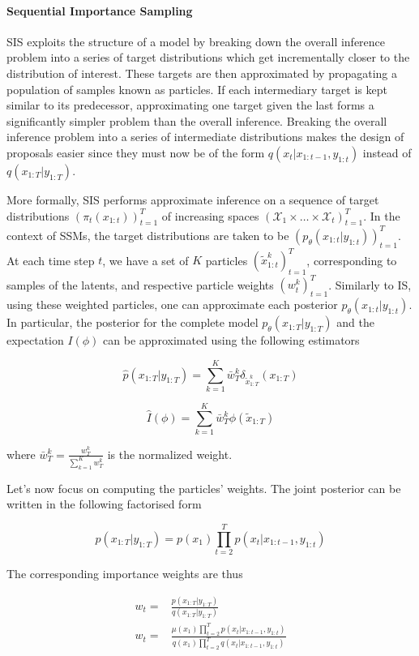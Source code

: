 \paragraph{Sequential Importance Sampling}
\gls{SIS} exploits the structure of a model by breaking down the overall inference problem into a series of target distributions which get incrementally closer to the distribution of interest.
These targets are then approximated by propagating a population of samples known as particles. If each intermediary target is kept similar to its predecessor, approximating one target given the last forms a significantly simpler problem than the overall inference.
Breaking the overall inference problem into a series of intermediate distributions makes the design of proposals easier since they must now be of the form $q(x_t|x_{1:t-1},y_{1:t})$ instead of $q(x_{1:T}|y_{1:T})$.

More formally, \gls{SIS} performs approximate inference on a sequence of target distributions
$\left(\pi_t(x_{1:t}) \right)_{t=1}^T$ of increasing spaces 
$\left(\mathcal{X}_1 \times \dots \times \mathcal{X}_t \right)_{t=1}^T$.
In the context of \glspl{SSM}, the target distributions are taken to be
$\left(p_\theta(x_{1:t}|y_{1:t}) \right)_{t=1}^T$.
At each time step $t$, we have a set of $K$ particles $\left(\tilde{x}_{1:t}^k \right)_{t=1}^T$,
corresponding to samples of the latents, and respective particle weights $\left({w}_{t}^k \right)_{t=1}^T$.
Similarly to \gls{IS}, using these weighted particles, one can approximate each posterior
$p_\theta(x_{1:t}|y_{1:t})$.
In particular, the posterior for the complete model $p_\theta(x_{1:T}|y_{1:T})$ and the expectation $I(\phi)$ can be approximated using the following estimators

$$ \hat{p}(x_{1:T}|y_{1:T}) = \sum_{k=1}^K \bar{w}_T^k \delta_{\tilde{x}_{1:T}^k} ({x}_{1:T})$$

$$ \hat{I}(\phi) = \sum_{k=1}^K \bar{w}_T^k \phi(\tilde{x}_{1:T})$$

where $\bar{w}_T^k = \frac{{w}_T^k}{\sum_{k=1}^K {w}_T^k}$ is the normalized weight.



Let's now focus on computing the particles' weights. The joint posterior can be written in the following factorised form

$$ p(x_{1:T}|y_{1:T}) = p(x_1) \prod_{t=2}^T p(x_t|x_{1:t-1},y_{1:t}) $$

The corresponding importance weights are thus

\begin{equation} \label{eq:IS_w}
\begin{aligned}
w_t =& \frac{p(x_{1:T}|y_{1:T})}{q(x_{1:T}|y_{1:T})} \\
w_t =& \frac{\mu(x_1) \prod_{t=2}^T p(x_t|x_{1:t-1},y_{1:t})}{q(x_1) \prod_{t=2}^T q(x_t|x_{1:t-1},y_{1:t})} \\
\end{aligned}
\end{equation}

